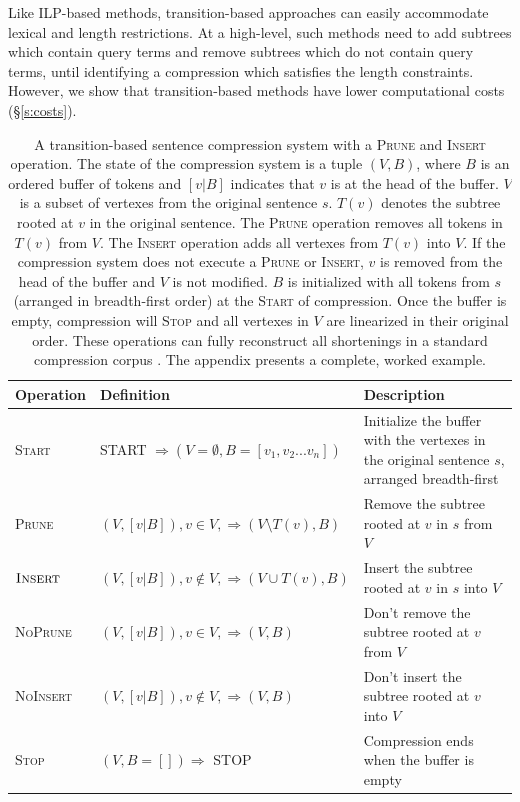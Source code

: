 \documentclass[11pt,a4paper]{article}
\begin{document}
Like ILP-based methods, transition-based approaches can easily accommodate lexical and length restrictions. At a high-level, such methods need to add subtrees which contain query terms and remove subtrees which do not contain query terms, until identifying a compression which satisfies the length constraints. However, we show that transition-based methods have lower computational costs (\S\ref{s:costs}).

\begin{table}[]
\centering
\begin{tabular}{llp{70mm}}
\textbf{Operation} &             \textbf{Definition}                                                    &      \textbf{Description}    \\ \hline
\textsc{Start}      & START $\Rightarrow ( V=\emptyset,  B=[v_1, v_2 ... v_n])$ & Initialize the buffer with the vertexes in the original sentence $s$, arranged breadth-first \\ \hline
\textsc{Prune}              & $(V, [v|B]), v \in V,  \Rightarrow (V \setminus  T(v), B)$ & Remove the subtree rooted at $v$ in $s$ from $V$ \\  
$\textsc{Insert}$             & $(V, [v|B]), v \notin V, \Rightarrow (V \cup T(v), B)$ & Insert the subtree rooted at $v$ in $s$ into $V$  \\ \hline
\textsc{NoPrune}           & $(V, [v|B]), v \in V, \Rightarrow (V, B)$ & Don't remove the subtree rooted at $v$ from $V$  \\ 
\textsc{NoInsert}          &       $(V, [v|B]), v \notin V, \Rightarrow (V, B)$ &   Don't insert the subtree rooted at $v$ into $V$    \\ \hline
\textsc{Stop}             & $ (V, B=[]) \Rightarrow$ STOP & Compression ends when the buffer is empty \\                                               
\end{tabular}
\caption{A transition-based sentence compression system with a \textsc{Prune} and \textsc{Insert} operation. The state of the compression system is a tuple $(V, B)$, where $B$ is an ordered buffer of tokens and $[v|B]$ indicates that $v$ is at the head of the buffer. $V$ is a subset of vertexes from the original sentence $s$. $T(v)$ denotes the subtree rooted at $v$ in the original sentence. The \textsc{Prune} operation removes all tokens in $T(v)$ from $V$. The \textsc{Insert} operation adds all vertexes from $T(v)$ into $V$. If the compression system does not execute a \textsc{Prune} or \textsc{Insert}, $v$ is removed from the head of the buffer and $V$ is not modified. $B$ is initialized with all tokens from $s$ (arranged in breadth-first order) at the \textsc{Start} of compression. Once the buffer is empty, compression will \textsc{Stop} and all vertexes in $V$ are linearized in their original order. These operations can fully reconstruct all shortenings in a standard compression corpus \cite{filippova2013overcoming}. The appendix presents a complete, worked example.}
\label{t:ops}
\end{table}
\end{document}
